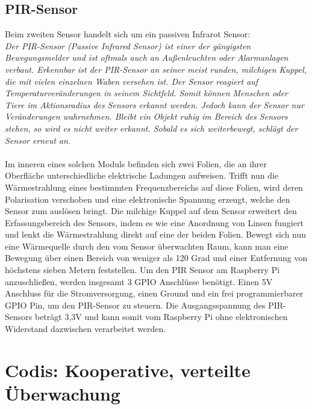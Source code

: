 \documentclass[journal]{IEEEtran}
\begin{document}
\subsection{PIR-Sensor}
Beim zweiten Sensor handelt sich um ein passiven Infrarot Sensor:\\ \textit{Der PIR-Sensor (Passive Infrared Sensor) ist einer der gängigsten Bewegungsmelder und ist oftmals auch an Außenleuchten oder Alarmanlagen verbaut. Erkennbar ist der PIR-Sensor an seiner meist runden, milchigen Kuppel, die mit vielen einzelnen Waben versehen ist. Der Sensor reagiert auf Temperaturveränderungen in seinem Sichtfeld. Somit können Menschen oder Tiere im Aktionsradius des Sensors erkannt werden. Jedoch kann der Sensor nur Veränderungen wahrnehmen. Bleibt ein Objekt ruhig im Bereich des Sensors stehen, so wird es nicht weiter erkannt.  Sobald es sich weiterbewegt, schlägt der Sensor erneut an.}\cite[S. 493]{raspi}\\ \\ Im inneren eines solchen Moduls befinden sich zwei Folien, die an ihrer Oberfläche unterschiedliche elektrische Ladungen aufweisen. Trifft nun die Wärmestrahlung eines bestimmten Frequenzbereichs auf diese Folien, wird deren Polarisation verschoben und eine elektronische Spannung erzeugt, welche den Sensor zum auslösen bringt. Die milchige Kuppel auf dem Sensor erweitert den Erfassungsbereich des Sensors, indem es wie eine Anordnung von Linsen fungiert und lenkt die Wärmestrahlung direkt auf eine der beiden Folien. Bewegt sich nun eine Wärmequelle durch den vom Sensor überwachten Raum, kann man eine Bewegung über einen Bereich von weniger als 120 Grad und einer Entfernung von höchstens sieben Metern feststellen. Um den PIR Sensor am Raspberry Pi anzuschließen, werden insgesamt 3 GPIO Anschlüsse benötigt. Einen 5V Anschluss für die Stromversorgung, einen Ground und ein frei programmierbarer GPIO Pin, um den PIR-Sensor zu steuern. Die Ausgangsspannung des PIR-Sensors beträgt 3,3V und kann somit vom Raspberry Pi ohne elektronischen Widerstand dazwischen verarbeitet werden.


\section{Codis: Kooperative, verteilte Überwachung}
\end{document}
